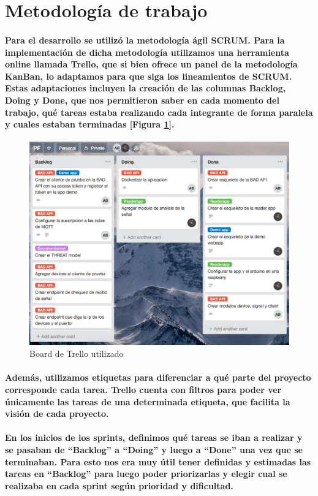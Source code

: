 \documentclass{article}
\begin{document}
\section{Metodología de trabajo}
\paragraph{
Para el desarrollo se utilizó la metodología ágil SCRUM. Para la implementación de dicha metodología utilizamos una herramienta online llamada Trello, que si bien ofrece un panel de la metodología KanBan, lo adaptamos para que siga los lineamientos de SCRUM. Estas adaptaciones incluyen la creación de las columnas Backlog, Doing y Done, que nos permitieron saber en cada momento del trabajo, qué tareas estaba realizando cada integrante de forma paralela y cuales estaban terminadas [Figura \ref{fig:trelloboard}].
}

\begin{figure}[ht]
    \centering
    \includegraphics[width=\textwidth]{trelloboard.png}%
    \caption{Board de Trello utilizado}
    \label{fig:trelloboard}
\end{figure}

\paragraph{
Además, utilizamos etiquetas para diferenciar a qué parte del proyecto corresponde cada tarea. Trello cuenta con filtros para poder ver únicamente las tareas de una determinada etiqueta, que facilita la visión de cada proyecto.
}
\paragraph{
En los inicios de los sprints, definimos qué tareas se iban a realizar y se pasaban de “Backlog” a “Doing” y luego a “Done” una vez que se terminaban. Para esto nos era muy útil tener definidas y estimadas las tareas en “Backlog” para luego poder priorizarlas y elegir cual se realizaba en cada sprint según prioridad y dificultad.
}
\end{document}
